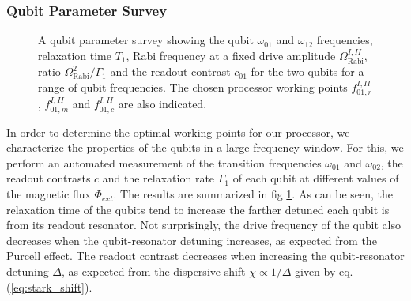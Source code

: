 \subsubsection{Qubit Parameter Survey} \label{section:qubit_parameter_survey}

\begin{figure}[p!]
   \centering
	 \caption{A qubit parameter survey showing the qubit $\omega_{01}$ and $\omega_{12}$ frequencies, relaxation time $T_1$, Rabi frequency at a fixed drive amplitude $\Omega_\mathrm{Rabi}^{I,II}$, ratio $\Omega_\mathrm{Rabi}^2/\Gamma_1$ and the readout contrast $c_{01}$ for the two qubits for a range of qubit frequencies. The chosen processor working points $f_{01,r}^{I,II}$, $f_{01,m}^{I,II}$ and $f_{01,c}^{I,II}$ are also indicated. }
	 \label{fig:qubit_parameters}
\end{figure}

In order to determine the optimal working points for our processor, we characterize the properties of the qubits in a large frequency window. For this, we perform an automated measurement of the transition frequencies $\omega_{01}$ and $\omega_{02}$, the readout contrasts $c$ and the relaxation rate $\Gamma_1$ of each qubit at different values of the magnetic flux $\Phi_{ext}$. The results are summarized in fig \ref{fig:qubit_parameters}. As can be seen, the relaxation time of the qubits tend to increase the farther detuned each qubit is from its readout resonator. Not surprisingly, the drive frequency of the qubit also decreases when the qubit-resonator detuning increases, as expected from the Purcell effect. The readout contrast decreases when increasing the qubit-resonator detuning $\Delta$, as expected from the dispersive shift $\chi\propto 1/\Delta$ given by eq. (\ref{eq:stark_shift}).


